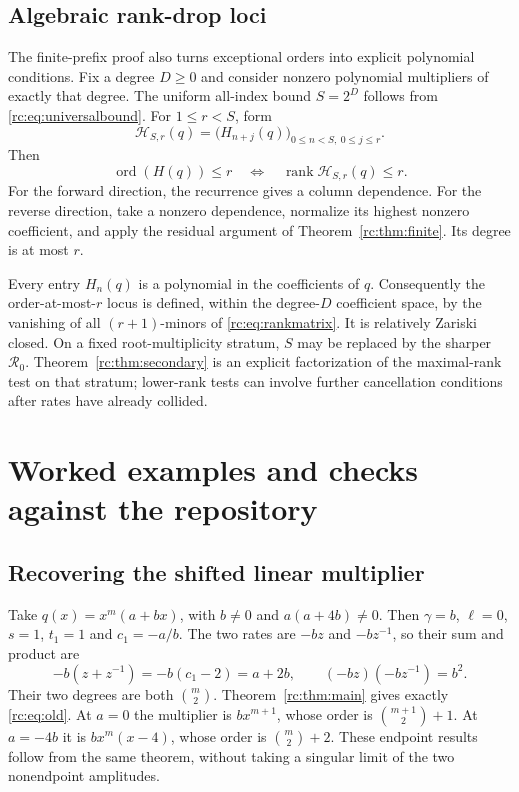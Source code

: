 \documentclass[11pt,a4paper]{article}
\numberwithin{equation}{section}
\theoremstyle{definition}
\theoremstyle{remark}
\newcommand{\rank}{\operatorname{rank}}
\newcommand{\ord}{\operatorname{ord}}
\newcommand{\Rzero}{\mathcal R_0}
\begin{document}
\subsection{Algebraic rank-drop loci}
The finite-prefix proof also turns exceptional orders into explicit
polynomial conditions.  Fix a degree $D\ge0$ and consider nonzero
polynomial multipliers of exactly that degree.  The uniform all-index
bound $S=2^D$ follows from \eqref{rc:eq:universalbound}.
For $1\le r<S$, form
\begin{equation}\label{rc:eq:rankmatrix}
 \mathcal H_{S,r}(q)=\bigl(H_{n+j}(q)\bigr)_{
                        0\le n<S,\ 0\le j\le r}.
\end{equation}
Then
\begin{equation}\label{rc:eq:rankcriterion}
 \ord(H(q))\le r\quad\Longleftrightarrow\quad
                 \rank\mathcal H_{S,r}(q)\le r.
\end{equation}
For the forward direction, the recurrence gives a column dependence.
For the reverse direction, take a nonzero dependence, normalize its
highest nonzero coefficient, and apply the residual argument of
Theorem~\ref{rc:thm:finite}.  Its degree is at most $r$.

Every entry $H_n(q)$ is a polynomial in the coefficients of $q$.
Consequently the order-at-most-$r$ locus is defined, within the degree-$D$
coefficient space, by the vanishing of all $(r+1)$-minors of
\eqref{rc:eq:rankmatrix}.  It is relatively Zariski closed.  On a fixed
root-multiplicity stratum, $S$ may be replaced by the sharper $\Rzero$.
Theorem~\ref{rc:thm:secondary} is an explicit factorization of the maximal-rank
test on that stratum; lower-rank tests can involve further cancellation
conditions after rates have already collided.

\clearpage
\section{Worked examples and checks against the repository}\label{rc:sec:examples}

\subsection{Recovering the shifted linear multiplier}
Take $q(x)=x^m(a+bx)$, with $b\ne0$ and $a(a+4b)\ne0$.
Then $\gamma=b$, $\ell=0$, $s=1$, $t_1=1$ and $c_1=-a/b$.
The two rates are $-bz$ and $-bz^{-1}$, so their sum and product are
\[
 -b(z+z^{-1})=-b(c_1-2)=a+2b,
 \qquad (-bz)(-bz^{-1})=b^2.
\]
Their two degrees are both $\binom m2$.
Theorem~\ref{rc:thm:main} gives exactly \eqref{rc:eq:old}.
At $a=0$ the multiplier is $b x^{m+1}$, whose order is
$\binom{m+1}2+1$.  At $a=-4b$ it is $b x^m(x-4)$, whose order is
$\binom m2+2$.  These endpoint results follow from the same theorem,
without taking a singular limit of the two nonendpoint amplitudes.
\end{document}
